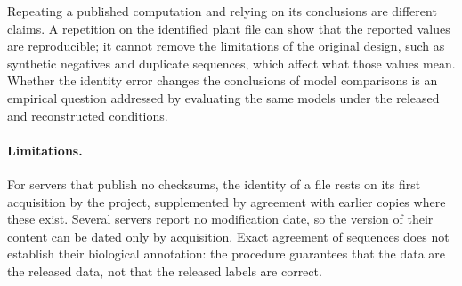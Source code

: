Repeating a published computation and relying on its conclusions are different
claims. A repetition on the identified plant file can show that the reported
values are reproducible; it cannot remove the limitations of the original
design, such as synthetic negatives and duplicate sequences, which affect what
those values mean. Whether the identity error changes the conclusions of model
comparisons is an empirical question addressed by evaluating the same models
under the released and reconstructed conditions.

\paragraph{Limitations.}
For servers that publish no checksums, the identity of a file rests on its first
acquisition by the project, supplemented by agreement with earlier copies where
these exist. Several servers report no modification date, so the version of
their content can be dated only by acquisition. Exact agreement of sequences
does not establish their biological annotation: the procedure guarantees that
the data are the released data, not that the released labels are correct.
